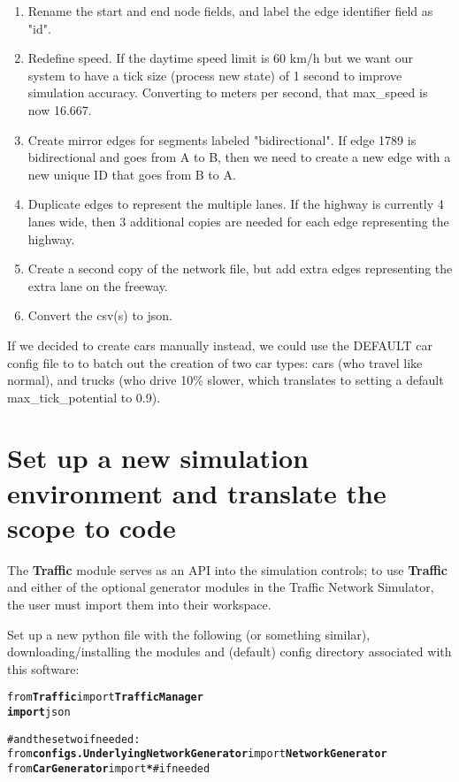 \begin{enumerate}
    \item Rename the start and end node fields, and label the edge identifier field as "id". 
    \item Redefine speed.  If the daytime speed limit is 60 km/h but we want our system to have a tick size (process new state) of 1 second to improve simulation accuracy.  Converting to meters per second, that max\_speed is now 16.667.
    \item Create mirror edges for segments labeled "bidirectional".  If edge 1789 is bidirectional and goes from A to B, then we need to create a new edge with a new unique ID that goes from B to A.
    \item Duplicate edges to represent the multiple lanes.  If the highway is currently 4 lanes wide, then 3 additional copies are needed for each edge representing the highway.
    \item Create a second copy of the network file, but add extra edges representing the extra lane on the freeway.
    \item Convert the csv(s) to json.
\end{enumerate}

\noindent If we decided to create cars manually instead, we could use the DEFAULT car config file to to batch out the creation of two car types:  cars (who travel like normal), and trucks (who drive 10\% slower, which translates to setting a default max\_tick\_potential to 0.9).



\section{Set up a new simulation environment and translate the scope to code }

\par The \textbf{Traffic} module serves as an API into the simulation controls; to use \textbf{Traffic} and either of the optional generator modules in the Traffic Network Simulator, the user must import them into their workspace. \\

\par Set up a new python file with the following (or something similar), downloading/installing the modules and (default) config directory associated with this software:

\begin{alltt}
from \textbf{Traffic} import \textbf{TrafficManager}
\textbf{import} json

# and these two if needed:
from \textbf{configs.UnderlyingNetworkGenerator} import \textbf{NetworkGenerator} 
from \textbf{CarGenerator} import \textbf{*}      # if needed
\end{alltt}

